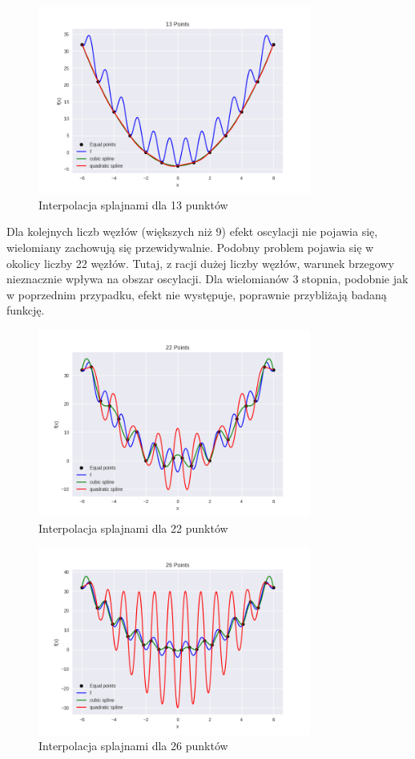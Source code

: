 \documentclass{article}
\begin{document}
\begin{figure}[H]
    \centering
    \includegraphics[width=0.8\textwidth]{img/spline_13.png}
    \caption{Interpolacja splajnami dla 13 punktów}
\end{figure}

Dla kolejnych liczb węzłów (większych niż 9) efekt oscylacji nie pojawia się, wielomiany zachowują się przewidywalnie.
Podobny problem pojawia się w okolicy liczby 22 węzłów. Tutaj, z racji dużej liczby węzłów, warunek brzegowy nieznacznie wpływa na obszar oscylacji.
Dla wielomianów 3 stopnia, podobnie jak w poprzednim przypadku, efekt nie występuje, poprawnie przybliżają badaną funkcję.

\begin{figure}[H]
    \centering
    \includegraphics[width=0.8\textwidth]{img/spline_22.png}
    \caption{Interpolacja splajnami dla 22 punktów}
\end{figure}

\begin{figure}[H]
    \centering
    \includegraphics[width=0.8\textwidth]{img/spline_26.png}
    \caption{Interpolacja splajnami dla 26 punktów}
\end{figure}
\end{document}
